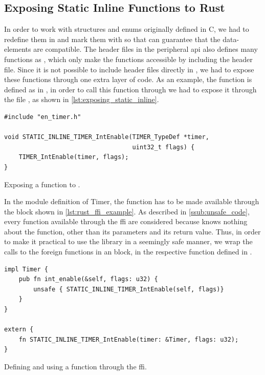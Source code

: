 \subsection{Exposing Static Inline Functions to Rust}

In order to work with structures and enums originally defined in C, we had to redefine them in {\rust} and mark them with \attrib{\#[repr(C)]} so that {\rust} can guarantee that the data-elements are {\C} compatible.
The header files in the peripheral \gls{api} also defines many functions as , which only make the functions accessible by including the header file.
Since it is not possible to include {\C} header files directly in {\rust}, we had to expose these functions through one extra layer of {\C} code.
As an example, the  function is defined as  in , in order to call this function through {\rust} we had to expose it through the file , as shown in \autoref{lst:exposing_static_inline}.

\begin{listing}[h]
\begin{verbatim}
#include "en_timer.h"

void STATIC_INLINE_TIMER_IntEnable(TIMER_TypeDef *timer,
                                   uint32_t flags) {
    TIMER_IntEnable(timer, flags);
}
\end{verbatim}
\caption{Exposing a  function to {\rust}.}
\label{lst:exposing_static_inline}
\end{listing}

In the {\rust} module definition of Timer, the function has to be made available through the  block shown in \autoref{lst:rust_ffi_example}.
As described in \autoref{ssub:unsafe_code}, every function available through the \gls{ffi} are considered {\unsafe} because {\rust} knows nothing about the function, other than its parameters and its return value.
Thus, in order to make it practical to use the library in a seemingly safe manner, we wrap the calls to the foreign functions in an {\unsafe} block, in the respective function defined in {\rust}.

\begin{listing}[h]
\begin{verbatim}
impl Timer {
    pub fn int_enable(&self, flags: u32) {
        unsafe { STATIC_INLINE_TIMER_IntEnable(self, flags)}
    }
}

extern {
    fn STATIC_INLINE_TIMER_IntEnable(timer: &Timer, flags: u32);
}
\end{verbatim}
\caption{Defining and using a function through the {\rust} \gls{ffi}.}
\label{lst:rust_ffi_example}
\end{listing}

